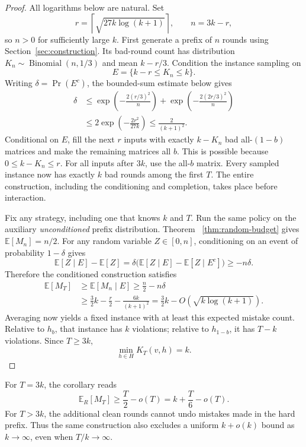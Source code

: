 \documentclass[11pt]{article}
\newcommand{\E}{\mathbb{E}}
\DeclareMathOperator{\Bin}{Binomial}
\theoremstyle{remark}
\begin{document}
\begin{proof}
All logarithms below are natural. Set
\[
 r=\left\lceil\sqrt{27k\log(k+1)}\right\rceil,
 \qquad n=3k-r,
\]
so $n>0$ for sufficiently large $k$. First generate a prefix of $n$ rounds
using Section~\ref{sec:construction}. Its bad-round count has distribution
$K_n\sim\Bin(n,1/3)$ and mean $k-r/3$. Condition the instance sampling on
\[
                        E=\{k-r\le K_n\le k\}.
\]
Writing $\delta=\Pr(E^c)$, the bounded-sum estimate below gives
\begin{align*}
 \delta
 &\le \exp\!\left(-\frac{2(r/3)^2}{n}\right)
       +\exp\!\left(-\frac{2(2r/3)^2}{n}\right)\\
 &\le 2\exp\!\left(-\frac{2r^2}{27k}\right)
 \le \frac{2}{(k+1)^2}.
\end{align*}
Conditional on $E$, fill the next $r$ inputs with exactly $k-K_n$ bad
all-$(1-b)$ matrices and make the remaining matrices all $b$. This is possible
because $0\le k-K_n\le r$. For all inputs after $3k$, use the all-$b$ matrix.
Every sampled instance now has exactly $k$ bad rounds among the first $T$.
The entire construction, including the conditioning and completion, takes
place before interaction.

Fix any strategy, including one that knows $k$ and $T$. Run the same policy
on the auxiliary \emph{unconditioned} prefix distribution. Theorem~
\ref{thm:random-budget} gives $\E[M_n]=n/2$. For any random variable
$Z\in[0,n]$, conditioning on an event of probability $1-\delta$ gives
\[
 \E[Z\mid E]-\E[Z]
   =\delta\bigl(\E[Z\mid E]-\E[Z\mid E^c]\bigr)
   \ge -n\delta.
\]
Therefore the conditioned construction satisfies
\begin{align*}
 \E[M_T]
 &\ge \E[M_n\mid E]
 \ge \frac n2-n\delta\\
 &\ge \frac32k-\frac r2-\frac{6k}{(k+1)^2}
 =\frac32k-O\!\left(\sqrt{k\log(k+1)}\right).
\end{align*}
Averaging now yields a fixed instance with at least this expected mistake
count. Relative to $h_b$, that instance has $k$ violations; relative to
$h_{1-b}$, it has $T-k$ violations. Since $T\ge 3k$,
\[
                  \min_{h\in H}K_T(v,h)=k.
\]
\end{proof}

For $T=3k$, the corollary reads
\[
            \E_R[M_T]\ge \frac T2-o(T)
            =k+\frac T6-o(T).
\]
For $T>3k$, the additional clean rounds cannot undo mistakes made in the hard
prefix. Thus the same construction also excludes a uniform $k+o(k)$ bound as
$k\to\infty$, even when $T/k\to\infty$.
\end{document}
